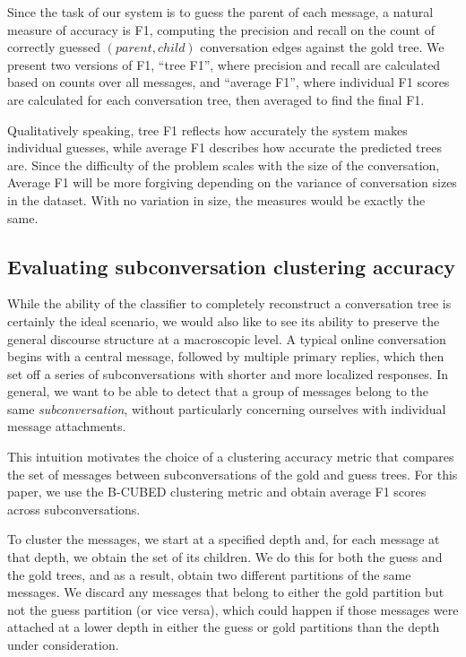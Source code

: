 \documentclass{article}
\begin{document}
Since the task of our system is to guess the parent of each message, a natural
measure of accuracy is F1, computing the precision and recall on the count of
correctly guessed $(parent,child)$ conversation edges against the gold tree.
We present two versions of F1, ``tree F1'', where precision and recall are
calculated based on counts over all messages, and ``average F1'', where
individual F1 scores are calculated for each conversation tree, then averaged
to find the final F1.

Qualitatively speaking, tree F1 reflects how accurately the system makes
individual guesses, while average F1 describes how accurate the predicted
trees are. Since the difficulty of the problem scales with the size of the
conversation, Average F1 will be more forgiving depending on the variance of
conversation sizes in the dataset. With no variation in size, the measures
would be exactly the same.

\subsection{Evaluating subconversation clustering accuracy}
While the ability of the classifier to completely reconstruct a conversation
tree is certainly the ideal scenario, we would also like to see its ability to
preserve the general discourse structure at a macroscopic level. A typical
online conversation begins with a central message, followed by multiple
primary replies, which then set off a series of subconversations with shorter
and more localized responses. In general, we want to be able to detect that a
group of messages belong to the same \emph{subconversation}, without
particularly concerning ourselves with individual message attachments.

This intuition motivates the choice of a clustering accuracy metric that
compares the set of messages between subconversations of the gold and guess
trees. For this paper, we use the B-CUBED clustering metric \cite{Bagga98} and
obtain average F1 scores across subconversations.

To cluster the messages, we start at a specified depth and, for each message
at that depth, we obtain the set of its children. We do this for both the
guess and the gold trees, and as a result, obtain two different partitions of
the same messages. We discard any messages that belong to either the gold
partition but not the guess partition (or vice versa), which could happen if
those messages were attached at a lower depth in either the guess or gold
partitions than the depth under consideration.
\end{document}
